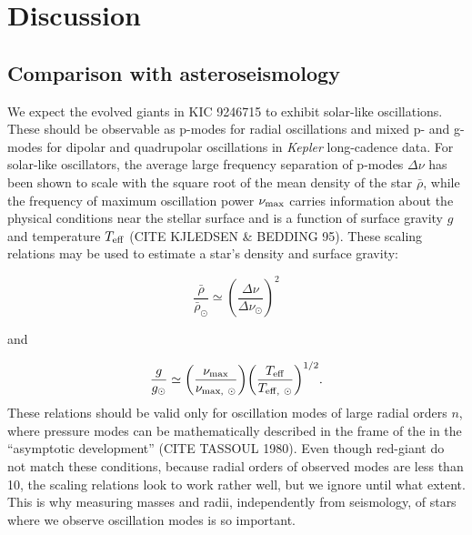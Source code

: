 \section{Discussion}\label{discuss}

\subsection{Comparison with asteroseismology}\label{seismo}

We expect the evolved giants in KIC 9246715 to exhibit solar-like oscillations. These should be observable as p-modes for radial oscillations and mixed p- and g- modes for dipolar and quadrupolar oscillations in \emph{Kepler} long-cadence data. For solar-like oscillators, the average large frequency separation of p-modes $\Delta \nu$ has been shown to scale with the square root of the mean density of the star $\bar{\rho}$, while the frequency of maximum oscillation power $\nu_{\rm{max}}$ carries information about the physical conditions near the stellar surface and is a function of surface gravity $g$ and temperature $T_{\rm{eff}}$ (CITE KJLEDSEN \& BEDDING 95). These scaling relations may be used to estimate a star's density and surface gravity:

\begin{equation} \label{density}
{\frac{\bar{\rho}}{\bar{\rho}_{\odot}}} \simeq {\left( \frac{\Delta \nu}{\Delta \nu_{\odot}} \right)}^{2}
\end{equation}

and

\begin{equation} \label{gravity}
{\frac{g}{g_{\odot}}} \simeq {\left( \frac{\nu_{\rm{max}}}{\nu_{\rm{max}, \ \odot}} \right)} {\left( \frac{T_{\rm{eff}}}{T_{\rm{eff}, \ \odot}} \right)}^{1/2}.
\end{equation}
These relations should be valid only for oscillation modes of large radial orders $n$, where pressure modes can be mathematically described in the frame of the  in the ``asymptotic development'' (CITE TASSOUL 1980). Even though red-giant do not match these conditions, because radial orders of observed modes are less than 10, the scaling relations look to work rather well, but we ignore until what extent. This is why measuring masses and radii, independently from seismology, of stars where we observe oscillation modes is so important.

